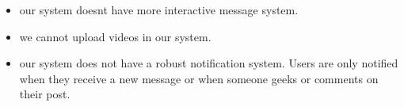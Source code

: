 \documentclass{article}
\begin{document}
\begin{itemize}
    \item our system doesnt have more interactive message system.
    \item we cannot upload videos in our system.
    \item our system does not have a robust notification system. Users are only notified when they receive a new message or when someone geeks or comments on their post.
\end{itemize}
\end{document}

